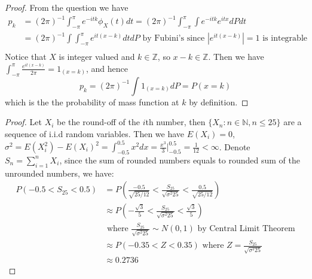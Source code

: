 \documentclass[10pt]{article}
\newenvironment{problem}[2][Problem]{\begin{trivlist}
\item[\hskip \labelsep {\bfseries #1}\hskip \labelsep {\bfseries #2.}]}{\end{trivlist}}
\begin{document}

\begin{problem}{2}
\end{problem}

\begin{proof}
From the question we have
\begin{equation}
\begin{split}
p_{k} &= (2\pi)^{-1}\int_{-\pi}^{\pi}e^{-itk}\phi_{X}(t)dt 
= (2\pi)^{-1}\int_{-\pi}^{\pi}\int e^{-itk}e^{itx}dPdt\\
&= (2\pi)^{-1}\int\int_{-\pi}^{\pi} e^{it(x-k)}dtdP \text{ by Fubini's since } |e^{it(x-k)}|=1 \text{ is integrable} \\
\end{split}
\end{equation}
Notice that $X$ is integer valued and $k\in \mathbb{Z}$, so $x-k \in \mathbb{Z}$. Then we have $\int_{-\pi}^{\pi} \frac{e^{it(x-k)}}{2\pi} = 1_{(x = k)}$, and hence
\begin{equation}
p_{k} = (2\pi)^{-1}\int1_{(x = k)}dP = P(x=k)
\end{equation}
which is the the probability of mass function at $k$ by definition.
\end{proof}


\begin{problem}{3}
\end{problem}

\begin{proof}
Let $X_{i}$ be the round-off of the $i$th number, then $\{X_{n}: n\in \mathbb{N}, n \le 25\}$ are a sequence of i.i.d random variables. Then we have $E(X_{i}) = 0$,
$\sigma^2 = E(X_{i}^2) - E(X_{i})^2 = \int_{-0.5}^{0.5}x^2dx = \frac{x^3}{3}|_{-0.5}^{0.5} = \frac{1}{12} < \infty$. Denote $S_{n} = \sum_{i=1}^{n}X_{i}$, since the sum of rounded numbers equals to rounded sum of the unrounded numbers, we have:
\begin{equation}
\begin{split}
P(-0.5 < S_{25} < 0.5) &= 
P(\frac{-0.5}{\sqrt{25/12}} < \frac{S_{25}}{\sqrt{\sigma^2 25}} < \frac{0.5}{\sqrt{25/12}})\\
&\approx P(-\frac{\sqrt{3}}{5} < \frac{S_{25}}{\sqrt{\sigma^2 25}} < \frac{\sqrt{3}}{5})\\
&\text{ where } \frac{S_{25}}{\sqrt{\sigma^2 25}} \sim N(0,1) \text{ by Central Limit Theorem}\\
&\approx P(-0.35 < Z < 0.35) \text{ where } Z = \frac{S_{25}}{\sqrt{\sigma^2 25}}\\
&\approx 0.2736
\end{split}
\end{equation}
\end{proof}
\end{document}
